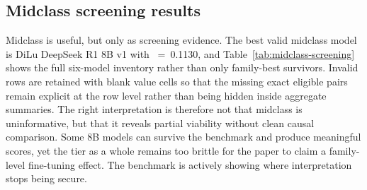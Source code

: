 \begin{table}[t]
\caption{Lightweight base-versus-fine-tuned pair inventory. All attempted lightweight pairs are shown; delta fields remain empty when the pair is not jointly ranking-eligible. Positive values favor the fine-tuned model except for latency, where negative is better.}
\label{tab:lightweight-pair-delta}
\centering
\small
{}
\end{table}

\subsection{Midclass screening results}

Midclass is useful, but only as screening evidence. The best valid midclass model is DiLu DeepSeek R1 8B v1 with ~=~0.1130, and Table~\ref{tab:midclass-screening} shows the full six-model inventory rather than only family-best survivors. Invalid rows are retained with blank value cells so that the missing exact eligible pairs remain explicit at the row level rather than being hidden inside aggregate summaries. The right interpretation is therefore not that midclass is uninformative, but that it reveals partial viability without clean causal comparison. Some 8B models can survive the benchmark and produce meaningful scores, yet the tier as a whole remains too brittle for the paper to claim a family-level fine-tuning effect. The benchmark is actively showing where interpretation stops being secure.

